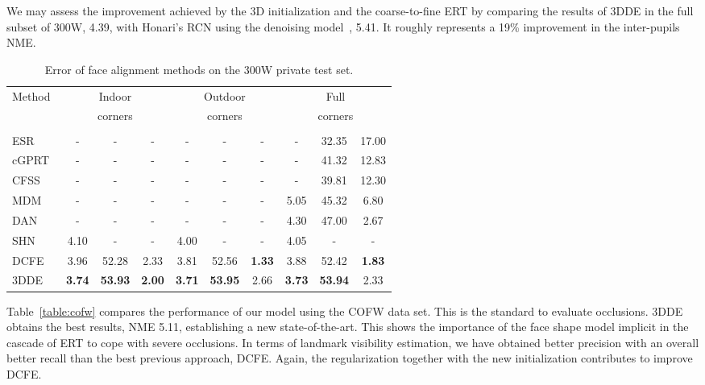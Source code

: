 \documentclass[11pt,twocolumn]{article}
\begin{document}
We may assess the improvement achieved by the 3D initialization and the coarse-to-fine ERT by comparing the results of 3DDE in the full subset of 300W, 4.39, with Honari's RCN using the denoising model~\citep{Honari16}, 5.41. It roughly represents a 19\% improvement in the inter-pupils NME. 

\begin{table*}
\footnotesize
\begin{center}
\setlength\tabcolsep{0.25pt}
\begin{tabular}{l|ccc|ccc|ccc}
\hline
\multirow{3}{*}{Method} & \multicolumn{3}{c|}{Indoor} & \multicolumn{3}{c|}{Outdoor} & \multicolumn{3}{c}{Full}\\
 & \multicolumn{3}{c|}{corners} & \multicolumn{3}{c|}{corners} & \multicolumn{3}{c}{corners}\\
 &  &  &  &  &  &  &  &  &  \\
\hline
ESR~\citep{Cao12} & - & - & - & - & - & - & - & 32.35 & 17.00 \\
cGPRT~\citep{Lee15b} & - & - & - & - & - & - & - & 41.32 & 12.83 \\
CFSS~\citep{Zhu15} & - & - & - & - & - & - & - & 39.81 & 12.30 \\
MDM~\citep{Trigeorgis16} & - & - & - & - & - & - & 5.05 & 45.32 & 6.80 \\
DAN~\citep{Kowalski17} & - & - & - & - & - & - & 4.30 & 47.00 & 2.67 \\
SHN~\citep{Yang17} & 4.10 & - & - & 4.00 & - & - & 4.05 & - & -  \\
DCFE~\citep{Valle18} & 3.96 & 52.28 & 2.33 & 3.81 & 52.56 & \textbf{1.33} & 3.88 & 52.42 & \textbf{1.83} \\
\hline
3DDE & \textbf{3.74} & \textbf{53.93} & \textbf{2.00}& \textbf{3.71} & \textbf{53.95} & 2.66 & \textbf{3.73} & \textbf{53.94} & 2.33\\
\hline
\end{tabular}
\end{center}
\caption{Error of face alignment methods on the 300W private test set.}
\label{table:300w_private}
\end{table*}

Table~\ref{table:cofw} compares the performance of our model using the COFW data set. This is the standard to evaluate occlusions. 3DDE obtains the best results, NME 5.11, establishing a new state-of-the-art. This shows the importance of the face shape model implicit in the cascade of ERT to cope with severe occlusions. In terms of landmark visibility estimation, we have obtained better precision with an overall better recall than the best previous approach, DCFE. Again, the regularization together with the new initialization contributes to improve DCFE. 
\end{document}
